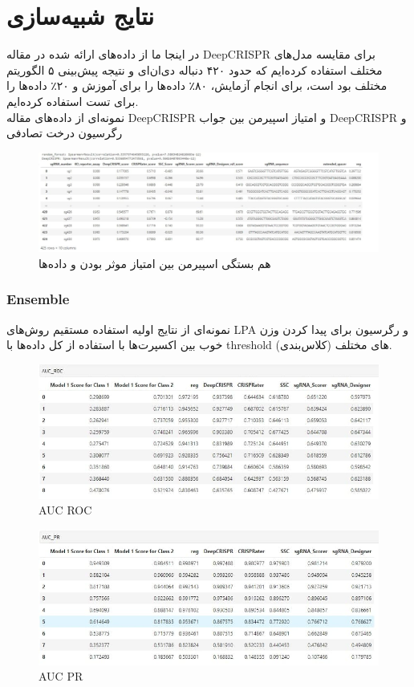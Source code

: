 \documentclass[12pt,a4paper,BCOR=.7cm,headsepline,bibliography=totoc]{report}
\begin{document}
\chapter{نتایج شبیه‌سازی}
در اینجا ما از داده‌های ارائه شده در مقاله DeepCRISPR برای مقایسه مدل‌های مختلف استفاده کرده‌ایم که حدود ۴۲۰ دنباله دی‌ان‌ای و نتیجه پیش‌بینی ۵ الگوریتم مختلف بود است، برای انجام آزمایش، ۸۰٪ داده‌ها را برای آموزش و ۲۰٪ داد‌ه‌ها را برای تست استفاده کرده‌ایم.\\

نمونه‌ای از داده‌های مقاله DeepCRISPR و امتیاز اسپیرمن بین جواب DeepCRISPR و رگرسیون درخت تصادفی
\begin{figure}[H]
\centering
\includegraphics[width=18cm, ]{pictures/DeepCRISPR_Data.jpg}
\caption{
هم بستگی اسپیرمن بین امتیاز موثر بودن و داده‌ها
}\label{wrap-fig:4}
\end{figure}
\subsection{Ensemble}
  نمونه‌ای از نتایج اولیه استفاده مستقیم روش‌های LPA و رگرسیون برای پیدا کردن وزن خوب بین اکسپرت‌ها با استفاده از کل داده‌ها با threshold های مختلف (کلاس‌بندی).
\begin{figure}[H]
\centering
\includegraphics[width=15cm, ]{pictures/DeepCRISPR_AUR.jpg}
\caption{
AUC ROC
}\label{wrap-fig:4}
\end{figure}

\begin{figure}[H]
\centering
\includegraphics[width=15cm, ]{pictures/DeepCRISPR_PR.jpg}
\caption{
AUC PR
}\label{wrap-fig:4}
\end{figure}
\end{document}

